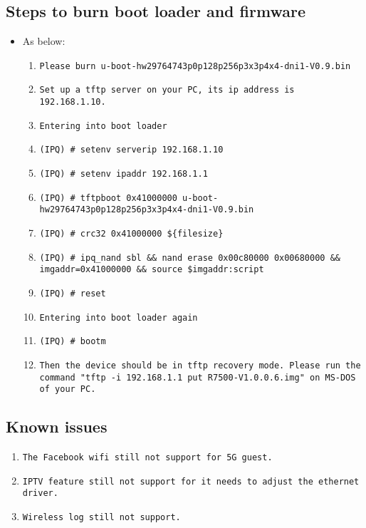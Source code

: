 \documentclass[12pt]{report}
\begin{document}
    \subsection{Steps to burn boot loader and firmware}
    \begin{itemize}
    \item As below:
            \begin{enumerate}
	    	\item \texttt{Please burn u-boot-hw29764743p0p128p256p3x3p4x4-dni1-V0.9.bin}
		\item \texttt{Set up a tftp server on your PC, its ip address is 192.168.1.10.}
		\item \texttt{Entering into boot loader}
		\item \texttt{(IPQ) \# setenv serverip 192.168.1.10}
		\item \texttt{(IPQ) \# setenv ipaddr 192.168.1.1}
		\item \texttt{(IPQ) \# tftpboot 0x41000000 u-boot-hw29764743p0p128p256p3x3p4x4-dni1-V0.9.bin}
		\item \texttt{(IPQ) \# crc32 0x41000000 \$\{filesize\}}
		\item \texttt{(IPQ) \# ipq\_nand sbl \&\& nand erase 0x00c80000 0x00680000 \&\& imgaddr=0x41000000 \&\& source \$imgaddr:script}
		\item \texttt{(IPQ) \# reset}
		\item \texttt{Entering into boot loader again}
		\item \texttt{(IPQ) \# bootm}
		\item \texttt{Then the device should be in tftp recovery mode. Please run the command "tftp -i 192.168.1.1 put R7500-V1.0.0.6.img" on MS-DOS of your PC.}
            \end{enumerate}
    \end{itemize}

\subsection{Known issues}
            \begin{enumerate}
		\item \texttt{The Facebook wifi still not support for 5G guest.}
		\item \texttt{IPTV feature still not support for it needs to adjust the ethernet driver.}
		\item \texttt{Wireless log still not support.}
            \end{enumerate}
\end{document}
